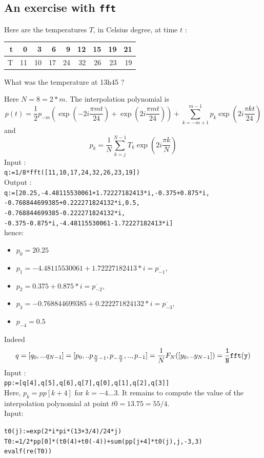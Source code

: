 \documentclass[a4paper,11pt]{book}
\begin{document}
\subsection{An {\bf exercise} with {\tt fft}}
Here are the temperatures $T$, in Celsius degree, at time $t$ :
\begin{center}
\begin{tabular}{|r|rrrrrrrr|}
\hline
t & 0 & 3 & 6 & 9 &12 & 15 & 19 & 21\\
\hline
T & 11 & 10 & 17 & 24 & 32 & 26 & 23 & 19\\
\hline
\end{tabular}
\end{center}
What was the temperature at 13h45 ?

Here $N=8=2*m$. The interpolation polynomial is
\[ p(t)=\frac{1}{2} p_{-m}(\exp(-2i\frac{\pi mt}{24})+
\exp(2i\frac{\pi mt}{24}))+
\sum_{k=-m+1}^{m-1}p_k \exp(2i\frac{\pi kt}{24}) \]
and
\[ p_k=\frac{1}{N} \sum_{k=j}^{N-1}T_k \exp(2i\frac{\pi k}{N}) \]
Input :\\
{\tt q:=1/8*fft([11,10,17,24,32,26,23,19])}\\
Output :\\
{\tt q:=[20.25,-4.48115530061+1.72227182413*i,-0.375+0.875*i,\\
-0.768844699385+0.222271824132*i,0.5,\\
-0.768844699385-0.222271824132*i,\\
-0.375-0.875*i,-4.48115530061-1.72227182413*i]}\\
hence:
\begin{itemize}
\item $p_0=20.25$
\item $p_1=-4.48115530061+1.72227182413*i=\overline{p_{-1}}$,
\item $p_2=0.375+0.875*i=\overline{p_{-2}}$,
\item $p_3=-0.768844699385+0.222271824132*i=\overline{p_{-3}}$,
\item $p_{-4}=0.5$
\end{itemize}
Indeed
\[
q=[q_0,...q_{N-1}]=[p_0,..p_{\frac{N}{2}-1},p_{-\frac{N}{2}},..,p_{-1}]=\frac{1}{N}F_N([y_0,..y_{N-1}])={\tt
  \frac{1}{N}fft(y)} \]
Input :\\
{\tt pp:=[q[4],q[5],q[6],q[7],q[0],q[1],q[2],q[3]]}\\
Here, $p_k=pp[k+4]$ for $k=-4...3$.
It remains to compute the value of the interpolation polynomial at point
$t0=13.75=55/4$.\\
Input: 
\begin{center}
{\tt t0(j):=exp(2*i*pi*(13+3/4)/24*j)}\\
{\tt T0:=1/2*pp[0]*(t0(4)+t0(-4))+sum(pp[j+4]*t0(j),j,-3,3)}\\
{\tt evalf(re(T0))}
\end{center}
\end{document}
